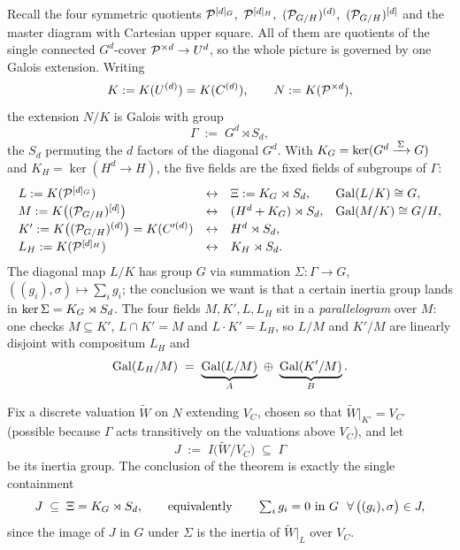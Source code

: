 \documentclass[11pt]{article}
\begin{document}
Recall the four symmetric quotients
$\cP^{[d]_G},\ \cP^{[d]_H},\ (\cP_{G/H})^{(d)},\ (\cP_{G/H})^{[d]}$ and the master
diagram with Cartesian upper square. All of them are quotients of the single
connected $G^d$-cover $\mathcal{P}^{\times d}\to U^d$, so the whole picture is governed
by one Galois extension. Writing
\[
K := K(U^{(d)}) = K(C^{(d)}),\qquad N := K(\mathcal{P}^{\times d}),
\]
the extension $N/K$ is Galois with group
\[
\Gamma \;:=\; G^d \rtimes S_d ,
\]
the $S_d$ permuting the $d$ factors of the diagonal $G^d$. With
$K_{G}=\ker(G^d\xrightarrow{\,\Sigma\,}G)$ and $K_H=\ker(H^d\to H)$, the five fields
are the fixed fields of subgroups of $\Gamma$:
\[
\begin{array}{llll}
L  := K(\mathcal{P}^{[d]_G})        & \leftrightarrow & \Xi := K_{G}\rtimes S_d,
   & \operatorname{Gal}(L/K)\cong G,\\[2pt]
M  := K\big((\mathcal{P}_{G/H})^{[d]}\big) & \leftrightarrow & (H^d+K_{G})\rtimes S_d,
   & \operatorname{Gal}(M/K)\cong G/H,\\[2pt]
K' := K\big((\mathcal{P}_{G/H})^{(d)}\big) = K(C'^{(d)}) & \leftrightarrow & H^d\rtimes S_d,
   & \\[2pt]
L_H := K(\mathcal{P}^{[d]_H})       & \leftrightarrow & K_H\rtimes S_d. &
\end{array}
\]
The diagonal map $L/K$ has group $G$ via summation $\Sigma:\Gamma\to G$,
$((g_i),\sigma)\mapsto\sum_i g_i$; the conclusion we want is that a certain
inertia group lands in $\ker\Sigma=K_{G}\rtimes S_d$. The four fields $M,K',L,L_H$
sit in a \emph{parallelogram} over $M$: one checks $M\subseteq K'$,
$L\cap K' = M$ and $L\cdot K' = L_H$, so $L/M$ and $K'/M$ are linearly disjoint
with compositum $L_H$ and
\begin{equation}\label{eq:parallelogram}
\Gal(L_H/M)\;=\;\underbrace{\Gal(L/M)}_{A}\ \oplus\ \underbrace{\Gal(K'/M)}_{B}.
\end{equation}

Fix a discrete valuation $\widetilde W$ on $N$ extending $V_C$, chosen so that
$\widetilde W|_{K'} = V_{C'}$ (possible because $\Gamma$ acts transitively on the
valuations above $V_C$), and let
\[
J \;:=\; I\big(\widetilde W / V_C\big)\;\subseteq\;\Gamma
\]
be its inertia group. The conclusion of the theorem is exactly the single
containment
\begin{equation}\label{eq:goal}
J \;\subseteq\; \Xi=\KG\rtimes S_d ,
\qquad\text{equivalently}\qquad
\textstyle\sum_i g_i = 0\ \text{in}\ G\ \ \forall\,\big((g_i),\sigma\big)\in J ,
\end{equation}
since the image of $J$ in $G$ under $\Sigma$ is the inertia of $\widetilde W|_L$
over $V_C$.
\end{document}
